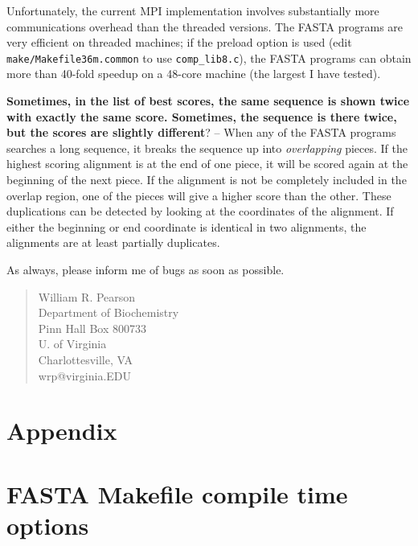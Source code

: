 \documentclass[11pt]{article}
\begin{document}
Unfortunately, the current MPI implementation involves substantially
more communications overhead than the threaded versions.  The FASTA
programs are very efficient on threaded machines; if the preload
option is used (edit \texttt{make/Makefile36m.common} to use
\texttt{comp\_lib8.c}), the FASTA programs can obtain more than 40-fold speedup on a 48-core machine (the largest I have tested). 

\vspace{0.5ex}
{\noindent}\textbf{Sometimes, in the list of best scores, the same sequence is
  shown twice with exactly the same score.  Sometimes, the sequence is
  there twice, but the scores are slightly different}? -- When any of
the FASTA programs searches a long sequence, it breaks the sequence up
into \emph{overlapping} pieces.  If the highest scoring alignment is
at the end of one piece, it will be scored again at the beginning of
the next piece.  If the alignment is not be completely included in the
overlap region, one of the pieces will give a higher score than the
other.  These duplications can be detected by looking at the
coordinates of the alignment.  If either the beginning or end
coordinate is identical in two alignments, the alignments are at least
partially duplicates.

\vspace{2ex}
As always, please inform me of bugs as soon as possible.

\begin{quote}
William R. Pearson\\
Department of Biochemistry\\
Pinn Hall Box 800733\\
U. of Virginia\\
Charlottesville, VA\\
wrp@virginia.EDU
\end{quote}




\appendix
\section*{Appendix}

\section{FASTA Makefile compile time options}
\end{document}
